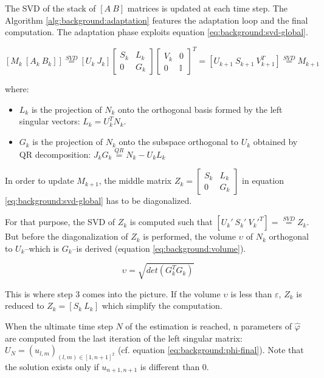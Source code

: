 \documentclass[/home/francois/latex/report/main.tex]{subfiles}
\begin{document}
The \ac{SVD} of the stack of $[A \ B]$ matrices is updated at each time step. The Algorithm \ref{alg:background:adaptation} features the adaptation loop and the final computation. The adaptation phase exploits equation \ref{eq:background:svd-global}.

\begin{equation}
  \label{eq:background:svd-global}
  [M_k \ [A_k \ B_k]] \overset{SVD}{=} [U_k \ J_k]
  \begin{bmatrix}
  S_k &  L_k \\
  0 & G_k
\end{bmatrix}
  \begin{bmatrix}
  V_k &  0 \\
  0 & \mathbb{I}
\end{bmatrix}^T = [U_{k+1} \ S_{k+1} \ V_{k+1}^T]
 \overset{SVD}{=} M_{k+1}
\end{equation}

where:
\begin{itemize}
  \item $L_k$ is the projection of $N_k$ onto the orthogonal basis formed by the left singular vectors: $L_k = U_k^T N_k$.
  \item $G_k$ is the projection of $N_k$ onto the subspace orthogonal to $U_k$ obtained by QR decomposition: $J_k G_k \overset{QR}{=} N_k - U_k L_k$
\end{itemize}

In order to update $M_{k+1}$, the middle matrix $Z_k=
\begin{bmatrix}
  S_k &  L_k \\
  0 & G_k
\end{bmatrix}$
in equation \ref{eq:background:svd-global} has to be diagonalized.

For that purpose, the \ac{SVD} of $Z_k$ is computed such that $[U_{k}' \ S_{k}' \ V_{k}'^T] = \overset{SVD}{=} Z_k$. But before the diagonalization of $Z_k$ is performed, the volume $\upsilon$ of $N_k$ orthogonal to $U_k$–which is $G_k$–is derived (equation \ref{eq:background:volume}).

\begin{equation}
  \label{eq:background:volume}
  \upsilon = \sqrt{det(G_k^T G_k)}
\end{equation}

This is where step 3 comes into the picture. If the volume $\upsilon$ is less than $\varepsilon$, $Z_k$ is reduced to $Z_k = [S_k \ L_k]$ which simplify the computation.

When the ultimate time step $N$ of the estimation is reached, n parameters of $\hat{\varphi}$ are computed from the last iteration of the left singular matrix: $U_{N} = (u_{l,m})_{(l, m) \in [1,n+1]^2}$ (cf. equation \ref{eq:background:phi-final}). Note that the solution exists only if $u_{n+1, n+1}$ is different than 0.
\end{document}
